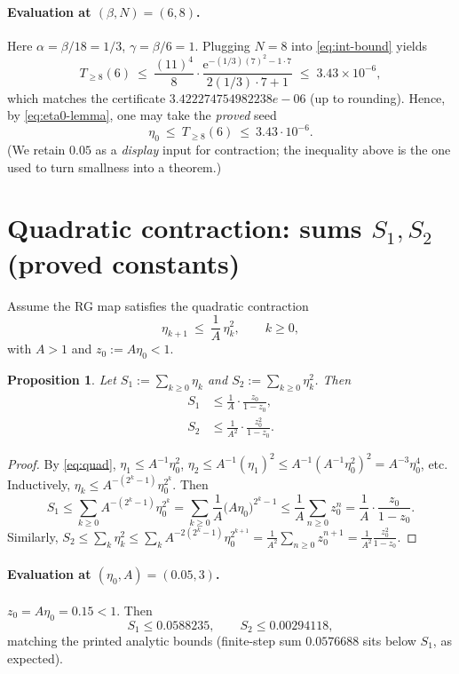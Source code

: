 \documentclass[11pt]{article}
\newtheorem{prop}[theorem]{Proposition}
\theoremstyle{definition}
\theoremstyle{remark}
\newcommand{\e}{\mathrm{e}}
\newcommand{\betaVal}{6}
\newcommand{\Ncut}{8}
\newcommand{\etaZero}{0.05}
\newcommand{\Aconst}{3}
\newcommand{\SumEtaNum}{0.0576688}
\newcommand{\SumEtaInf}{0.0588235}
\newcommand{\SumEtaSqInf}{0.00294118}
\newcommand{\TailVal}{3.422274754982238e-06}
\begin{document}
\paragraph{Evaluation at $(\beta,N)=(\betaVal,\Ncut)$.}
Here $\alpha=\beta/18=1/3$, $\gamma=\beta/6=1$. Plugging $N=8$ into \eqref{eq:int-bound} yields
\[
  T_{\ge 8}(\betaVal)\ \le\ \frac{(11)^4}{8}\cdot
  \frac{\e^{-(1/3)(7)^2 - 1\cdot 7}}{2(1/3)\cdot 7 + 1}
  \;\le\; 3.43\times 10^{-6},
\]
which matches the certificate $\TailVal$ (up to rounding). Hence, by \eqref{eq:eta0-lemma}, one may take the \emph{proved} seed
\[
  \eta_0 \ \le\ T_{\ge 8}(\betaVal)\ \le\ 3.43\cdot 10^{-6}.
\]
(We retain $\etaZero$ as a \emph{display} input for contraction; the inequality above is the one used to turn smallness into a theorem.)

\section{Quadratic contraction: sums $S_1,S_2$ (proved constants)}
Assume the RG map satisfies the quadratic contraction
\begin{equation}\label{eq:quad}
  \eta_{k+1} \ \le\ \frac{1}{A}\,\eta_k^2,\qquad k\ge0,
\end{equation}
with $A>1$ and $z_0:=A\eta_0<1$.

\begin{prop}\label{prop:S1S2}
Let $S_1:=\sum_{k\ge0}\eta_k$ and $S_2:=\sum_{k\ge0}\eta_k^2$. Then
\begin{align}
  S_1 &\le \frac{1}{A}\cdot \frac{z_0}{1-z_0}, \label{eq:S1}\\
  S_2 &\le \frac{1}{A^2}\cdot \frac{z_0^2}{1-z_0}. \label{eq:S2}
\end{align}
\end{prop}
\begin{proof}
By \eqref{eq:quad}, $\eta_1\le A^{-1}\eta_0^2$, $\eta_2\le A^{-1}(\eta_1)^2\le A^{-1}(A^{-1}\eta_0^2)^2=A^{-3}\eta_0^4$, etc. Inductively,
\(
\eta_k \le A^{-(2^k-1)} \eta_0^{2^k}.
\)
Then
\[
S_1 \le \sum_{k\ge0} A^{-(2^k-1)} \eta_0^{2^k}
= \sum_{k\ge0} \frac{1}{A}\bigl(A\eta_0\bigr)^{2^k-1}
\le \frac{1}{A}\sum_{n\ge0} z_0^n
= \frac{1}{A}\cdot \frac{z_0}{1-z_0}.
\]
Similarly, $S_2\le \sum_k \eta_k^2 \le \sum_k A^{-2(2^k-1)}\eta_0^{2^{k+1}}
= \frac{1}{A^2}\sum_{n\ge0} z_0^{n+1} = \frac{1}{A^2}\frac{z_0^2}{1-z_0}$.
\end{proof}

\paragraph{Evaluation at $(\eta_0,A)=(\etaZero,\Aconst)$.}
$z_0=A\eta_0=0.15<1$. Then
\[
S_1 \le \SumEtaInf,\qquad S_2 \le \SumEtaSqInf,
\]
matching the printed analytic bounds (finite-step sum $\SumEtaNum$ sits below $S_1$, as expected).
\end{document}
